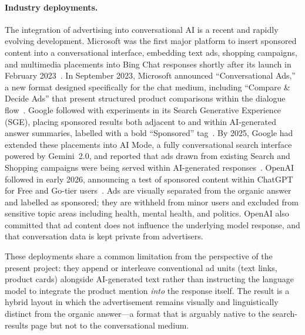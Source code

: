 \paragraph{Industry deployments.}
The integration of advertising into conversational AI is a recent and
rapidly evolving development. Microsoft was the first major platform
to insert sponsored content into a conversational interface, embedding
text ads, shopping campaigns, and multimedia placements into Bing Chat
responses shortly after its launch in February
2023~\cite{microsoft2023bingads}. In September 2023, Microsoft
announced ``Conversational Ads,'' a new format designed specifically
for the chat medium, including ``Compare \& Decide Ads'' that present
structured product comparisons within the dialogue
flow~\cite{microsoft2023conversationalads}. Google followed with
experiments in its Search Generative Experience (SGE), placing
sponsored results both adjacent to and within AI-generated answer
summaries, labelled with a bold ``Sponsored''
tag~\cite{google2023sge}. By 2025, Google had extended these
placements into AI Mode, a fully conversational search interface
powered by Gemini~2.0, and reported that ads drawn from existing
Search and Shopping campaigns were being served within AI-generated
responses~\cite{google2025aimode}. OpenAI followed in early 2026,
announcing a test of sponsored content within ChatGPT for Free and
Go-tier users~\cite{openai2026ads}. Ads are visually separated from
the organic answer and labelled as sponsored; they are withheld from
minor users and excluded from sensitive topic areas including health,
mental health, and politics. OpenAI also committed that ad content
does not influence the underlying model response, and that
conversation data is kept private from advertisers.

These deployments share a common limitation from the perspective of
the present project: they append or interleave conventional ad units
(text links, product cards) alongside AI-generated text rather than
instructing the language model to integrate the product mention
\emph{into} the response itself. The result is a hybrid layout in
which the advertisement remains visually and linguistically distinct
from the organic answer---a format that is arguably native to the
search-results page but not to the conversational medium.

